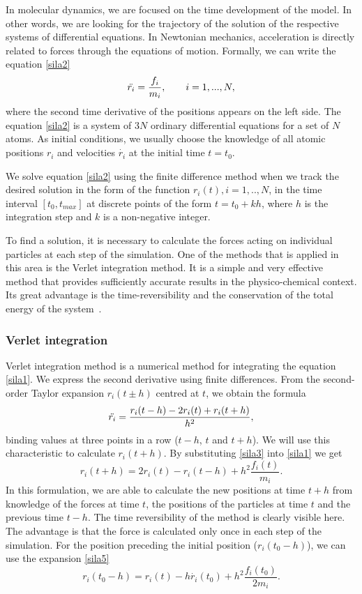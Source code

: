 In molecular dynamics, we are focused on the time development of the model. In other words, we are looking for the trajectory of the solution of the respective systems of differential equations. In Newtonian mechanics, acceleration is directly related to forces through the equations of motion. Formally, we can write the equation \ref{sila2}
\begin{equation}\label{sila2}
	\Ddot{r_i}=\frac{f_i}{m_i}, \qquad i=1,...,N,
\end{equation}
where the second time derivative of the positions appears on the left side. The equation \ref{sila2} is a system of 3$N$ ordinary differential equations for a set of $N$ atoms. As initial conditions, we usually choose the knowledge of all atomic positions $r_i$ and velocities $\dot{r_i}$ at the initial time $t=t_0$. 

We solve equation \ref{sila2} using the finite difference method when we track the desired solution in the form of the function $r_i(t), i=1,..,N$, in the time interval $[t_0,t_{max}]$ at discrete points of the form $t=t_0+kh$, where $h$ is the integration step and $k$ is a non-negative integer.

To find a solution, it is necessary to calculate the forces acting on individual particles at each step of the simulation. One of the methods that is applied in this area is the Verlet integration method. It is a simple and very effective method that provides sufficiently accurate results in the physico-chemical context. Its great advantage is the time-reversibility and the conservation of the total energy of the system~\cite{mdskripta}.

\subsubsection{Verlet integration}
Verlet integration method is a numerical method for integrating the equation \ref{sila1}. We express the second derivative using finite differences. From the second-order Taylor expansion $r_i(t\pm h)$ centred at $t$, we obtain the formula
\begin{equation}\label{sila3}
	\Ddot{r_i}=\frac{r_i(t-h)-2r_i(t)+r_i(t+h)}{h^2},
\end{equation}
binding values at three points in a row ($t-h$, $t$ and $t+h$). We will use this characteristic to calculate $r_i(t+h)$. By substituting \ref{sila3} into \ref{sila1} we get 
\begin{equation}\label{sila4}
	r_i(t+h)=2r_i(t)-r_i(t-h)+h^2\frac{f_i(t)}{m_i}.
\end{equation}
In this formulation, we are able to calculate the new positions at time $t+h$ from knowledge of the forces at time $t$, the positions of the particles at time $t$ and the previous time $t-h$. The time reversibility of the method is clearly visible here. The advantage is that the force is calculated only once in each step of the simulation. For the position preceding the initial position ($r_i(t_0-h)$), we can use the expansion \ref{sila5}
\begin{equation}\label{sila5}
	r_i(t_0-h)=r_i(t)-h\dot{r_i}(t_0)+h^2\frac{f_i(t_0)}{2m_i}.
\end{equation}

